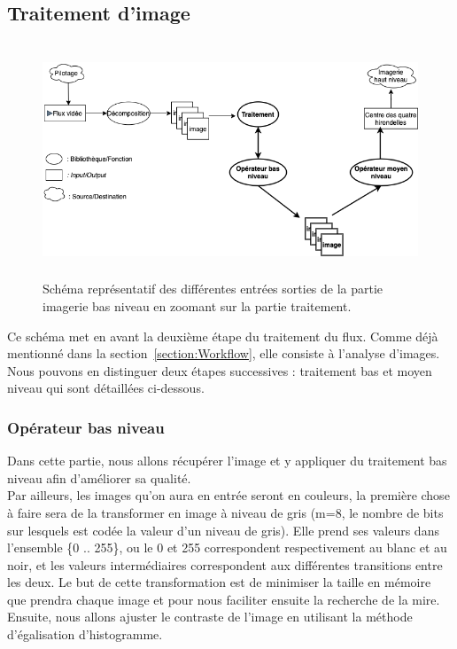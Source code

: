 \documentclass[12pt]{article}
\begin{document}
\subsection{Traitement d'image}
\label{section:Traitement}

 \begin{figure}[H]
\centering
\includegraphics[height=7cm]{workflowI.png}
\caption{Schéma représentatif des différentes entrées sorties de la partie imagerie bas niveau en zoomant sur la partie traitement. }
\label{fig:WorkflowI}
\end{figure}

Ce schéma met en avant la deuxième étape du traitement du flux. Comme déjà mentionné dans la section~\ref{section:Workflow}, elle consiste à l'analyse d'images.
Nous pouvons en distinguer deux étapes successives : traitement bas et moyen niveau qui sont détaillées ci-dessous.

\subsubsection{Opérateur bas niveau }
Dans cette partie, nous allons récupérer l'image et y appliquer du traitement bas niveau afin d'améliorer sa qualité. \\
Par ailleurs, les images qu’on aura en entrée seront 
en couleurs, la première chose à faire sera de la transformer en image à
niveau de gris (m=8, le nombre de bits sur lesquels est codée la valeur
d’un niveau de gris). Elle prend ses valeurs dans l’ensemble \{0 .. 255\}, ou
le 0 et 255 correspondent respectivement au blanc et au noir, et les valeurs
intermédiaires correspondent aux différentes transitions entre les deux. Le
but de cette transformation est de minimiser la taille en mémoire que
prendra chaque image et pour nous faciliter ensuite la recherche de la mire.\\
Ensuite, nous allons ajuster le contraste de l'image en utilisant la méthode d'égalisation d'histogramme.
\end{document}
